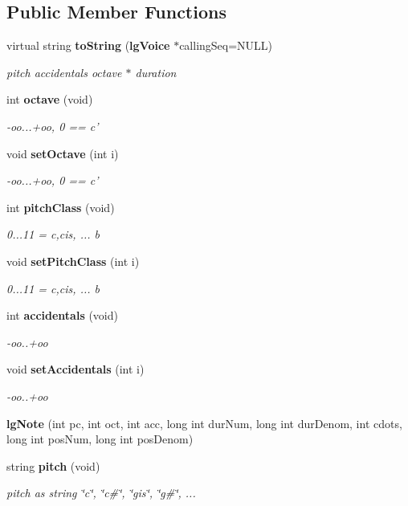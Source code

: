 \subsection*{Public Member Functions}
\begin{CompactItemize}
\item 
virtual string {\bf to\-String} ({\bf lg\-Voice} $\ast$calling\-Seq=NULL)
\begin{CompactList}\small\item\em pitch accidentals octave $\ast$ duration \item\end{CompactList}\item 
int {\bf octave} (void)
\begin{CompactList}\small\item\em -oo...+oo, 0 == c' \item\end{CompactList}\item 
void {\bf set\-Octave} (int i)
\begin{CompactList}\small\item\em -oo...+oo, 0 == c' \item\end{CompactList}\item 
int {\bf pitch\-Class} (void)
\begin{CompactList}\small\item\em 0...11 = c,cis, ... b \item\end{CompactList}\item 
void {\bf set\-Pitch\-Class} (int i)
\begin{CompactList}\small\item\em 0...11 = c,cis, ... b \item\end{CompactList}\item 
int {\bf accidentals} (void)
\begin{CompactList}\small\item\em -oo..+oo \item\end{CompactList}\item 
void {\bf set\-Accidentals} (int i)
\begin{CompactList}\small\item\em -oo..+oo \item\end{CompactList}\item 
{\bf lg\-Note} (int pc, int oct, int acc, long int dur\-Num, long int dur\-Denom, int cdots, long int pos\-Num, long int pos\-Denom)
\item 
string {\bf pitch} (void)
\begin{CompactList}\small\item\em pitch as string \char`\"{}c\char`\"{}, \char`\"{}c\#\char`\"{}, \char`\"{}gis\char`\"{}, \char`\"{}g\#\char`\"{}, ... \item\end{CompactList}\end{CompactItemize}
